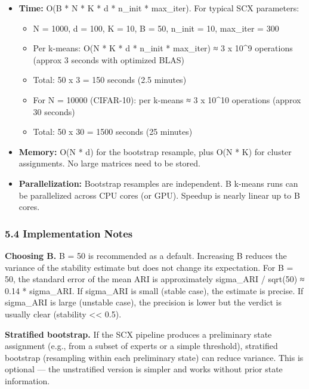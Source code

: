 \documentclass[
  12pt,
]{article}
\providecommand{\tightlist}{%
  \setlength{\itemsep}{0pt}\setlength{\parskip}{0pt}}
\begin{document}
\begin{itemize}
\item
  \textbf{Time:} O(B * N * K * d * n\_init * max\_iter). For typical SCX
  parameters:

  \begin{itemize}
  \tightlist
  \item
    N = 1000, d = 100, K = 10, B = 50, n\_init = 10, max\_iter = 300
  \item
    Per k-means: O(N * K * d * n\_init * max\_iter) ≈ 3 x 10\^{}9
    operations (approx 3 seconds with optimized BLAS)
  \item
    Total: 50 x 3 = 150 seconds (2.5 minutes)
  \item
    For N = 10000 (CIFAR-10): per k-means ≈ 3 x 10\^{}10 operations
    (approx 30 seconds)
  \item
    Total: 50 x 30 = 1500 seconds (25 minutes)
  \end{itemize}
\item
  \textbf{Memory:} O(N * d) for the bootstrap resample, plus O(N * K)
  for cluster assignments. No large matrices need to be stored.
\item
  \textbf{Parallelization:} Bootstrap resamples are independent. B
  k-means runs can be parallelized across CPU cores (or GPU). Speedup is
  nearly linear up to B cores.
\end{itemize}

\subsubsection{5.4 Implementation Notes}\label{implementation-notes}

\textbf{Choosing B.} B = 50 is recommended as a default. Increasing B
reduces the variance of the stability estimate but does not change its
expectation. For B = 50, the standard error of the mean ARI is
approximately sigma\_ARI / sqrt(50) ≈ 0.14 * sigma\_ARI. If sigma\_ARI
is small (stable case), the estimate is precise. If sigma\_ARI is large
(unstable case), the precision is lower but the verdict is usually clear
(stability \textless\textless{} 0.5).

\textbf{Stratified bootstrap.} If the SCX pipeline produces a
preliminary state assignment (e.g., from a subset of experts or a simple
threshold), stratified bootstrap (resampling within each preliminary
state) can reduce variance. This is optional --- the unstratified
version is simpler and works without prior state information.
\end{document}
